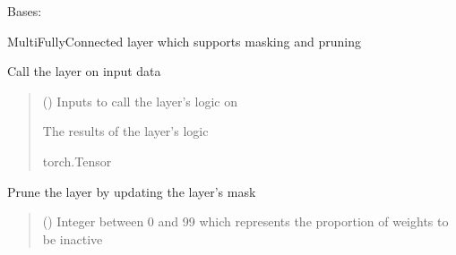 \documentclass[letterpaper,10pt,english]{sphinxmanual}
\begin{document}
\begin{fulllineitems}
\label{\detokenize{beyondml.pt.layers:beyondml.pt.layers.MultiMaskedDense.MultiMaskedDense}}
\pysigstartsignatures
{}
\pysigstopsignatures
\sphinxAtStartPar
Bases: 

\sphinxAtStartPar
Multi\sphinxhyphen{}Fully\sphinxhyphen{}Connected layer which supports masking and pruning

\begin{fulllineitems}
\label{\detokenize{beyondml.pt.layers:beyondml.pt.layers.MultiMaskedDense.MultiMaskedDense.forward}}
\pysigstartsignatures
{}
\pysigstopsignatures
\sphinxAtStartPar
Call the layer on input data
\begin{quote}\begin{description}
\sphinxAtStartPar
{} () \textendash{} Inputs to call the layer’s logic on

\sphinxAtStartPar
{} \textendash{} The results of the layer’s logic

\sphinxAtStartPar
torch.Tensor

\end{description}\end{quote}

\end{fulllineitems}


\begin{fulllineitems}
\label{\detokenize{beyondml.pt.layers:beyondml.pt.layers.MultiMaskedDense.MultiMaskedDense.prune}}
\pysigstartsignatures
{}
\pysigstopsignatures
\sphinxAtStartPar
Prune the layer by updating the layer’s mask
\begin{quote}\begin{description}
\sphinxAtStartPar
{} () \textendash{} Integer between 0 and 99 which represents the proportion of weights to be inactive


\end{description}
\end{quote}
\end{fulllineitems}
\end{fulllineitems}
\end{document}
